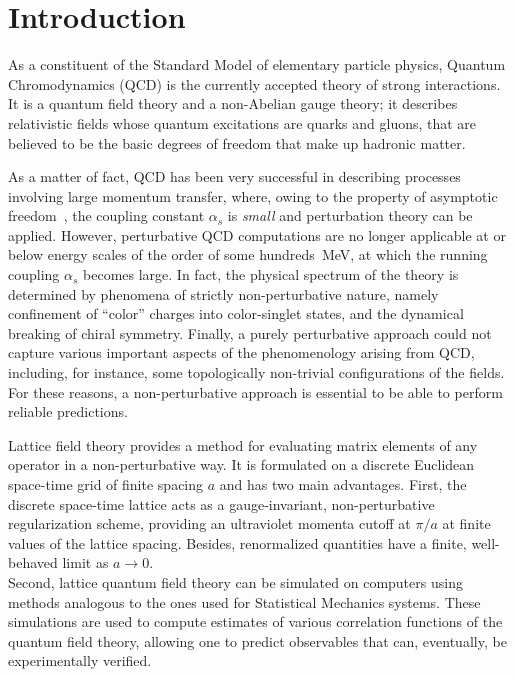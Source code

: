 \pagestyle{myFancy}
\chapter{Introduction}

As a constituent of the Standard Model of elementary particle physics, Quantum Chromodynamics (QCD) is the currently accepted theory of strong interactions.
It is a quantum field theory and a non-Abelian gauge theory; it describes relativistic fields whose quantum excitations are quarks and gluons, that are believed to be the basic degrees of freedom that make up hadronic matter.

As a matter of fact, QCD has been very successful in describing processes involving large momentum transfer, where, owing to the property of asymptotic freedom~\cite{Gross:1973id, Politzer:1973fx}, the coupling constant $\alpha_s$ is \emph{small} and perturbation theory can be applied.
However, perturbative QCD computations are no longer applicable at or below energy scales of the order of some hundreds~MeV, at which the running coupling $\alpha_s$ becomes large. In fact, the physical spectrum of the theory is determined by phenomena of strictly non-perturbative nature, namely confinement of ``color'' charges into color-singlet states, and the dynamical breaking of chiral symmetry.
Finally, a purely perturbative approach could not capture various important aspects of the phenomenology arising from QCD, including, for instance, some topologically non-trivial configurations of the fields.
For these reasons, a non-perturbative approach is essential to be able to perform reliable predictions.

Lattice field theory provides a method for evaluating matrix elements of any operator in a non-perturbative way.
It is formulated on a discrete Euclidean space-time grid of finite spacing $a$ and has two main advantages.
First, the discrete space-time lattice acts as a gauge-invariant, non-perturbative regularization scheme, providing an ultraviolet momenta cutoff at $\pi/a$ at finite values of the lattice spacing.
Besides, renormalized quantities have a finite, well-behaved limit as $a\to0$.\\
Second, lattice quantum field theory can be simulated on computers using methods analogous to the ones used for Statistical Mechanics systems.
These simulations are used to compute estimates of various correlation functions of the quantum field theory, allowing one to predict observables that can, eventually, be experimentally verified.

